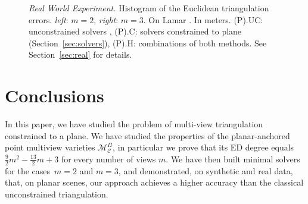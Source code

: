 \documentclass{article}
\begin{document}
\begin{figure}
%
    \caption{\textit{Real World Experiment.} Histogram of the Euclidean triangulation errors. \textit{left}: $m=2$, \textit{right}: $m=3$. On Lamar \cite{sarlin2022lamar}. In meters. (P).UC: unconstrained solvers \cite{DBLP:conf/caip/HartleyS95,DBLP:conf/accv/ByrodJA07}, (P).C: solvers constrained to plane (Section~\ref{sec:solvers}), (P).H: combinations of both methods. See Section~\ref{sec:real} for details.}
    \label{fig:real_tests}
\end{figure}

\section{Conclusions}
In this paper, we have studied the problem of multi-view triangulation constrained to a plane. We have studied the properties of the planar-anchored point multiview varieties $\mathcal{M}_{\mathcal{C}}^{\Pi}$, in particular we prove that its ED degree equals $\frac{9}{2}m^2 - \frac{13}{2}m + 3$ for every number of views $m$. We have then built minimal solvers for the cases~$m=2$ and $m=3$, and demonstrated, on synthetic and real data, that, on planar scenes, our approach achieves a higher accuracy than the classical unconstrained triangulation.
\end{document}
